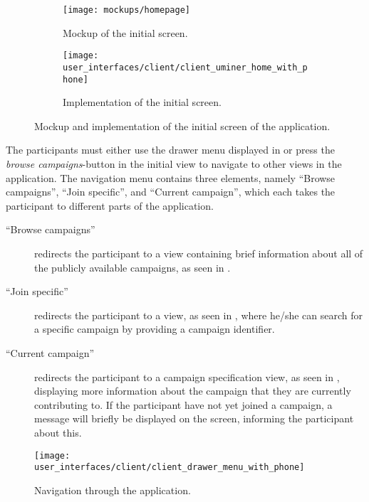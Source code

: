 \begin{figure}[!htbp]
    \begin{subfigure}[!t]{.48\textwidth}
        \centering
        \texttt{[image: mockups/homepage]}
        \caption{Mockup of the initial screen.}
        \label{fig:mockup_initial_screen}
    \end{subfigure}%
    \begin{subfigure}[!t]{.52\textwidth}
    \centering
        \texttt{[image: user\_interfaces/client/client\_uminer\_home\_with\_phone]}
        \caption{Implementation of the initial screen.}
        \label{fig:implementation_initial_screen}
    \end{subfigure}
    \caption{Mockup and implementation of the initial screen of the application.}
    \label{fig:initial_screen}
\end{figure}
\FloatBarrier

The participants must either use the drawer menu displayed in  or press the \emph{browse campaigns}-button in the initial view to navigate to other views in the application. The navigation menu contains three elements, namely ``Browse campaigns'', ``Join specific'', and ``Current campaign'', which each takes the participant to different parts of the application.

\begin{description}
    \item[``Browse campaigns''] redirects the participant to a view containing brief information about all of the publicly available campaigns, as seen in .

    \item[``Join specific''] redirects the participant to a view, as seen in , where he/she can search for a specific campaign by providing a campaign identifier.

    \item[``Current campaign''] redirects the participant to a campaign specification view, as seen in , displaying more information about the campaign that they are currently contributing to. If the participant have not yet joined a campaign, a message will briefly be displayed on the screen, informing the participant about this.
\end{description}

\begin{figure}[!htbp]
    \centering
    \texttt{[image: user\_interfaces/client/client\_drawer\_menu\_with\_phone]}
    \caption{Navigation through the application.}
    \label{fig:navigation}
\end{figure}
\FloatBarrier


